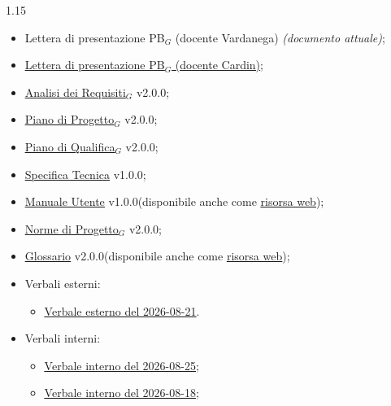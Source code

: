 \documentclass[a4paper, 11pt]{article}
\let\orighref\href
\renewcommand{\href}[2]{\orighref{#1}{\uline{#2}}}
\newcommand{\versioneAdR}{2.0.0}
\newcommand{\versioneGlossario}{2.0.0}
\newcommand{\versioneNdP}{2.0.0}
\newcommand{\versionePdP}{2.0.0}
\newcommand{\versionePdQ}{2.0.0}
\newcommand{\versioneST}{1.0.0}
\newcommand{\versioneMU}{1.0.0}
\begin{document}
\begin{spacing}{1.15}
\begin{itemize}
    \item Lettera di presentazione PB$_G$ (docente Vardanega) \textit{(documento attuale)};
    \item \href{https://thebitless.live/PB/lettera-di-presentazione/lettera-di-presentazione.pdf}{Lettera di presentazione PB$_G$ (docente Cardin)};
    \item \href{https://thebitless.live/PB/doc_esterna/analisi-dei-requisiti/analisi-dei-requisiti.pdf}{Analisi dei Requisiti$_G$} v\versioneAdR;
    \item \href{https://thebitless.live/PB/doc_esterna/piano-di-progetto/piano-di-progetto.pdf}{Piano di Progetto$_G$} v\versionePdP;
    \item \href{https://thebitless.live/PB/doc_esterna/piano-di-qualifica/piano-di-qualifica.pdf}{Piano di Qualifica$_G$} v\versionePdQ;
    \item \href{https://thebitless.live/PB/doc_esterna/specifica_tecnica/specifica_tecnica.pdf}{Specifica Tecnica} v\versioneST;
    \item \href{https://thebitless.live/PB/doc_esterna/manuale-utente/manuale-utente.pdf}{Manuale Utente} v\versioneMU (disponibile anche come \href{https://thebitless.live/website/manuale-utente.html}{risorsa web});
    \item \href{https://thebitless.live/PB/doc_interna/norme-di-progetto/norme-di-progetto.pdf}{Norme di Progetto$_G$} v\versioneNdP;
    \item \href{https://thebitless.live/PB/doc_interna/glossario/glossario.pdf}{Glossario} v\versioneGlossario (disponibile anche come \href{https://thebitless.live/website/glossario.html}{risorsa web});
    \item Verbali esterni:
    \begin{itemize}
        \item \href{https://thebitless.live/PB/doc_esterna/verbali/VE_2026-08-21_approvazione-mvp/VE_2026-08-21_approvazione-mvp.pdf}{Verbale esterno del 2026-08-21}.
    \end{itemize}
    \item Verbali interni:
    \begin{itemize}
        \item \href{https://thebitless.live/PB/doc_interna/verbali/VI_2026-08-25_chiusura-dodicesimo-sprint/VI_2026-08-25_chiusura-dodicesimo-sprint.pdf}{Verbale interno del 2026-08-25};
        \item \href{https://thebitless.live/PB/doc_interna/verbali/VI_2026-08-18_dodicesimo-sprint/VI_2026-08-18_dodicesimo-sprint.pdf}{Verbale interno del 2026-08-18};

\end{itemize}
\end{itemize}
\end{spacing}
\end{document}
